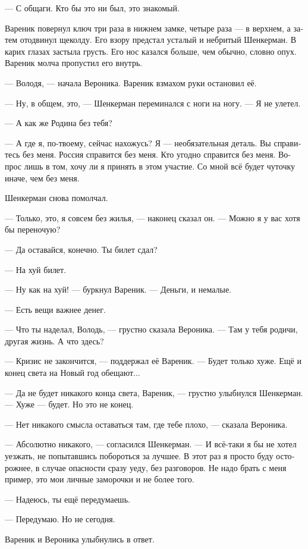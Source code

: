 \documentclass[a5paper,12pt,fleqn]{extbook}\usepackage{cooltooltips}\usepackage{polyglossia}\setdefaultlanguage[babelshorthands=true]{russian}\setotherlanguage{english}\defaultfontfeatures{Ligatures=TeX,Mapping=tex-text} \usepackage{xcolor}\definecolor{lightgray}{HTML}{bbbbbb}\color{lightgray}\newcommand{\ml}[3]{\textenglish{\textcolor{black}{#3}}}
\begin{document}
--- С общаги.
Кто бы это ни был, это знакомый.

Вареник повернул ключ три раза в нижнем замке, четыре раза --- в верхнем, а затем отодвинул щеколду.
Его взору предстал усталый и небритый Шенкерман.
В карих глазах застыла грусть.
Его нос казался больше, чем обычно, словно опух.
Вареник молча пропустил его внутрь.

--- Володя, --- начала Вероника.
Вареник взмахом руки остановил её.

--- Ну, в общем, это, --- Шенкерман переминался с ноги на ногу.
--- Я не улетел.

--- А как же Родина без тебя?

--- А где я, по-твоему, сейчас нахожусь?
Я --- необязательная деталь.
Вы справитесь без меня.
Россия справится без меня.
Кто угодно справится без меня.
Вопрос лишь в том, хочу ли я принять в этом участие.
Со мной всё будет чуточку иначе, чем без меня.

Шенкерман снова помолчал.

--- Только, это, я совсем без жилья, --- наконец сказал он.
--- Можно я у вас хотя бы переночую?

--- Да оставайся, конечно.
Ты билет сдал?

--- На хуй билет.

--- Ну как на хуй! --- буркнул Вареник.
--- Деньги, и немалые.

--- Есть вещи важнее денег.

--- Что ты наделал, Володь, --- грустно сказала Вероника.
--- Там у тебя родичи, другая жизнь.
А что здесь?

--- Кризис не закончится, --- поддержал её Вареник.
--- Будет только хуже.
Ещё и конец света на Новый год обещают...

--- Да не будет никакого конца света, Вареник, --- грустно улыбнулся Шенкерман.
--- Хуже --- будет.
Но это не конец.

--- Нет никакого смысла оставаться там, где тебе плохо, --- сказала Вероника.

--- Абсолютно никакого, --- согласился Шенкерман.
--- И всё-таки я бы не хотел уезжать, не попытавшись побороться за лучшее.
В этот раз я просто буду осторожнее, в случае опасности сразу уеду, без разговоров.
Не надо брать с меня пример, это мои личные заморочки и не более того.

--- Надеюсь, ты ещё передумаешь.

--- Передумаю.
Но не сегодня.

Вареник и Вероника улыбнулись в ответ.
\end{document}
